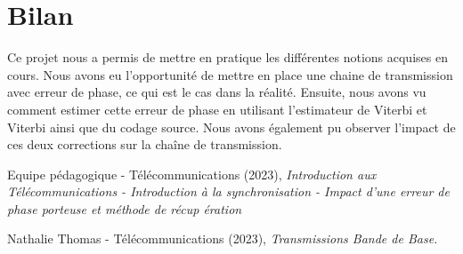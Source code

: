 \documentclass[11pt,a4paper]{report}
\begin{document}
\section{Bilan}

Ce projet nous a permis de mettre en pratique les différentes notions acquises en cours. Nous avons eu l'opportunité de mettre en place une chaine de transmission avec erreur de phase, ce qui est le cas dans la réalité. Ensuite, nous avons vu comment estimer cette erreur de phase en utilisant l'estimateur de Viterbi et Viterbi ainsi que du codage source. Nous avons également pu observer l'impact de ces deux corrections sur la chaîne de transmission.



\begin{thebibliography}{9}
Equipe pédagogique - Télécommunications (2023), \emph{Introduction aux Télécommunications - Introduction à la synchronisation - Impact d’une erreur de phase porteuse et méthode de récup ération}

Nathalie Thomas - Télécommunications (2023), \emph{Transmissions Bande de Base.}

\end{thebibliography}
\end{document}
